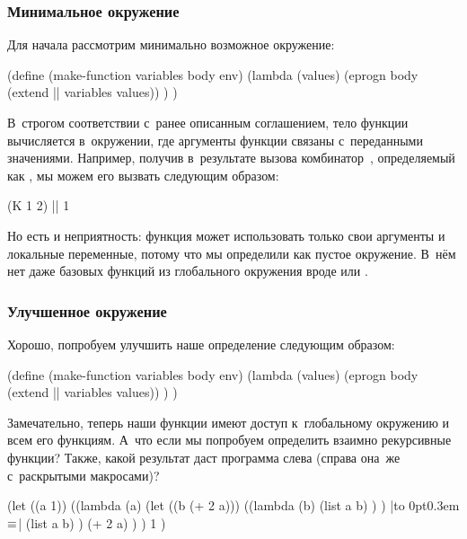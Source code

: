 \subsubsection{Минимальное окружение}

Для начала рассмотрим минимально возможное окружение:

\begin{code:lisp}
(define (make-function variables body env)
  (lambda (values)
    (eprogn body (extend || variables values)) ) )
\end{code:lisp}

В~строгом соответствии с~ранее описанным соглашением, тело функции вычисляется
в~окружении, где аргументы функции связаны с~переданными значениями. Например,
получив в~результате вызова  комбинатор~, определяемый
как , мы можем его вызвать следующим образом:

\begin{code:lisp}
(K 1 2) |\is| 1
\end{code:lisp}

Но есть и неприятность: функция может использовать только свои аргументы и
локальные переменные, потому что мы определили  как пустое
окружение. В~нём нет даже базовых функций из глобального окружения вроде
 или .


\subsubsection{Улучшенное окружение}

Хорошо, попробуем улучшить наше определение следующим образом:

\begin{code:lisp}
(define (make-function variables body env)
  (lambda (values)
    (eprogn body (extend || variables values)) ) )
\end{code:lisp}

Замечательно, теперь наши функции имеют доступ к~глобальному окружению и всем
его функциям. А~что если мы попробуем определить взаимно рекурсивные функции?
Также, какой результат даст программа слева (справа она~же с~раскрытыми
макросами)?

{\def\E{\hbox to 0pt{\kern0.3em$\equals$}}
\begin{code:lisp}
(let ((a 1))            ((lambda (a)
  (let ((b (+ 2 a)))       ((lambda (b)
    (list a b) ) )   |\E|         (list a b) )
                            (+ 2 a) ) )
                         1 )
\end{code:lisp}}

